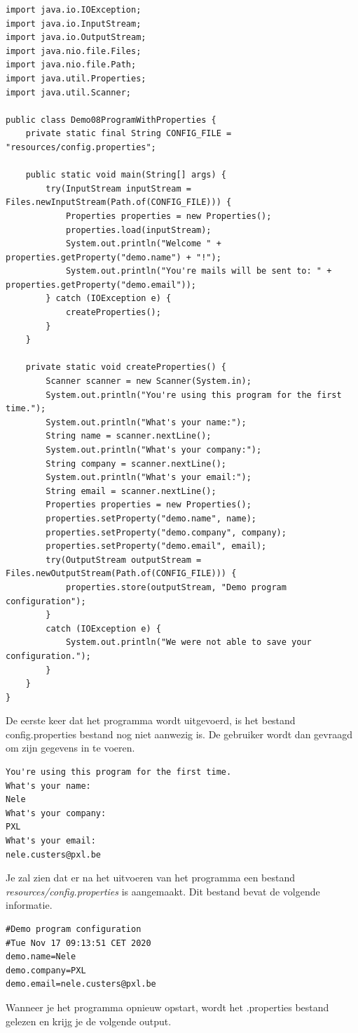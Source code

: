 \begin{lstlisting}
import java.io.IOException;
import java.io.InputStream;
import java.io.OutputStream;
import java.nio.file.Files;
import java.nio.file.Path;
import java.util.Properties;
import java.util.Scanner;

public class Demo08ProgramWithProperties {
	private static final String CONFIG_FILE = "resources/config.properties";

	public static void main(String[] args) {
		try(InputStream inputStream = Files.newInputStream(Path.of(CONFIG_FILE))) {
			Properties properties = new Properties();
			properties.load(inputStream);
			System.out.println("Welcome " + properties.getProperty("demo.name") + "!");
			System.out.println("You're mails will be sent to: " + properties.getProperty("demo.email"));
		} catch (IOException e) {
			createProperties();
		}
	}

	private static void createProperties() {
		Scanner scanner = new Scanner(System.in);
		System.out.println("You're using this program for the first time.");
		System.out.println("What's your name:");
		String name = scanner.nextLine();
		System.out.println("What's your company:");
		String company = scanner.nextLine();
		System.out.println("What's your email:");
		String email = scanner.nextLine();
		Properties properties = new Properties();
		properties.setProperty("demo.name", name);
		properties.setProperty("demo.company", company);
		properties.setProperty("demo.email", email);
		try(OutputStream outputStream = Files.newOutputStream(Path.of(CONFIG_FILE))) {
			properties.store(outputStream, "Demo program configuration");
		}
		catch (IOException e) {
			System.out.println("We were not able to save your configuration.");
		}
	}
}
\end{lstlisting}

De eerste keer dat het programma wordt uitgevoerd, is het bestand config.properties bestand nog niet aanwezig is. De gebruiker wordt dan gevraagd om zijn gegevens in te voeren.

\begin{verbatim}
You're using this program for the first time.
What's your name:
Nele
What's your company:
PXL
What's your email:
nele.custers@pxl.be
\end{verbatim}

Je zal zien dat er na het uitvoeren van het programma een bestand \textit{resources/config.properties} is aangemaakt.
Dit bestand bevat de volgende informatie.

\begin{verbatim}
#Demo program configuration
#Tue Nov 17 09:13:51 CET 2020
demo.name=Nele
demo.company=PXL
demo.email=nele.custers@pxl.be
\end{verbatim}
Wanneer je het programma opnieuw opstart, wordt het .properties bestand gelezen en krijg je de volgende output.

